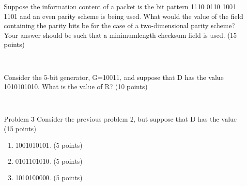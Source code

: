 \begin{exercise}[]{Suppose the information content of a packet is the bit pattern 1110 0110 1001
    1101 and an even parity scheme is being used. What would the value of the field containing
    the parity bits be for the case of a two-dimensional parity scheme? Your answer should be
    such that a minimumlength checksum field is used. (15 points)}
  \begin{solution}
  \par{~}
  \end{solution}
  \label{ex1}
\end{exercise}



\begin{exercise}[]{Consider the 5-bit generator, G=10011, and suppose that D has the value
    1010101010. What is the value of R? (10 points)}
  \begin{solution}
  \par{~}
  \end{solution}
  \label{ex2}
\end{exercise}


\begin{exercise}[]{Problem 3 Consider the previous problem 2, but suppose that D has the value (15 points)
    \begin{enumerate}
        \item 1001010101. (5 points)
        \item 0101101010. (5 points)
        \item 1010100000. (5 points)
    \end{enumerate} }
  \begin{solution}
  \par{~}
  \end{solution}
  \label{ex3}
\end{exercise}


